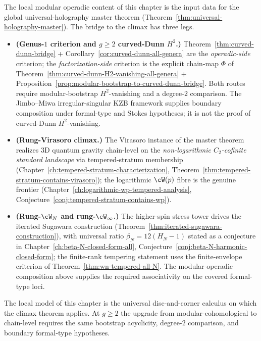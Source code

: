 \begin{remark}[Climax placement: curved-Dunn $H^2 = 0$ feeds the universal holography master]%
\label{rem:modular-operad-climax-placement}%
%
%
%
The local modular operadic content of this chapter is the input
data for the global universal-holography master theorem
(Theorem~\ref{thm:universal-holography-master}). The bridge to the
climax has three legs.
\begin{itemize}[nosep]
\item \textbf{(Genus-$1$ criterion and \(g\ge2\)
curved-Dunn \(H^2\).)}
 Theorem~\ref{thm:curved-dunn-bridge} +
 Corollary~\ref{cor:curved-dunn-all-genera} are the
 \emph{operadic-side} criterion; the \emph{factorization-side}
 criterion is the explicit chain-map $\Phi$ of
 Theorem~\ref{thm:curved-dunn-H2-vanishing-all-genera} +
 Proposition~\ref{prop:modular-bootstrap-to-curved-dunn-bridge}.
 Both routes require modular-bootstrap \(H^2\)-vanishing and a
 degree-\(2\) comparison. The Jimbo--Miwa irregular-singular KZB
 framework supplies boundary composition under formal-type and Stokes
 hypotheses; it is not the proof of curved-Dunn \(H^2\)-vanishing.
\item \textbf{(Rung-Virasoro climax.)} The Virasoro instance of the
 master theorem realizes 3D quantum gravity
 chain-level on the \emph{non-logarithmic $C_2$-cofinite standard
 landscape} via tempered-stratum membership
 (Chapter~\ref{ch:tempered-stratum-characterization},
 Theorem~\ref{thm:tempered-stratum-contains-virasoro}); the
 logarithmic $\cW(p)$ fibre is the genuine frontier
 (Chapter~\ref{ch:logarithmic-wp-tempered-analysis},
 Conjecture~\ref{conj:tempered-stratum-contains-wp}).
\item \textbf{(Rung-$\cW_N$ and rung-$\cW_\infty$.)}
 The higher-spin stress tower drives the iterated Sugawara
 construction
 (Theorem~\ref{thm:iterated-sugawara-construction}), with universal
 ratio $\beta_N = 12(H_N - 1)$ stated as a conjecture in
 Chapter~\ref{ch:beta-N-closed-form-all},
 Conjecture~\ref{conj:beta-N-harmonic-closed-form}; the
 finite-rank tempering statement uses the finite-envelope criterion of
 Theorem~\ref{thm:wn-tempered-all-N}. The
 modular-operadic composition above supplies the required
 associativity on the covered formal-type loci.
\end{itemize}
The local model of this chapter is the universal disc-and-corner
calculus on which the climax theorem applies. At $g \ge 2$ the
upgrade from modular-cohomological to chain-level requires
the same bootstrap acyclicity, degree-\(2\) comparison, and boundary
formal-type hypotheses.
\end{remark}

